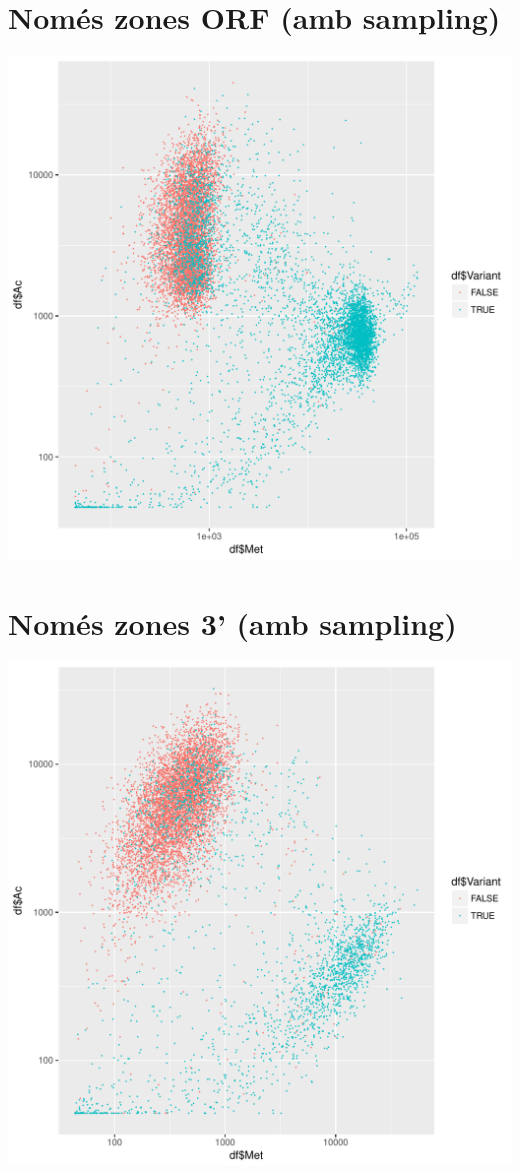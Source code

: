 \documentclass{article}\usepackage[]{graphicx}\usepackage[]{color}
\makeatletter
\def\maxwidth{ %
  \ifdim\Gin@nat@width>\linewidth
    \linewidth
  \else
    \Gin@nat@width
  \fi
}
\newenvironment{knitrout}{}{} %
\makeatother
\begin{document}
\section{Només zones ORF (amb sampling)}
\begin{knitrout}
\color{fgcolor}
\includegraphics[width=\maxwidth]{figure/plot_ORF_var-1} 

\end{knitrout}
\clearpage
\section{Només zones 3' (amb sampling)}
\begin{knitrout}
\color{fgcolor}
\includegraphics[width=\maxwidth]{figure/plot_3_var-1} 

\end{knitrout}
\end{document}
